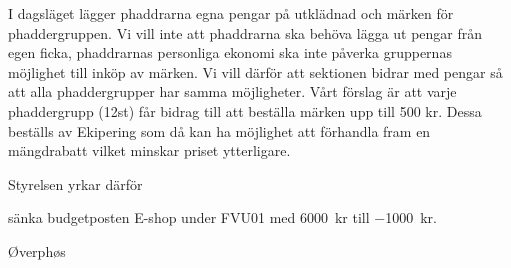 \documentclass[../_main/handlingar.tex]{subfiles}
\begin{document}

I dagsläget lägger phaddrarna egna pengar på utklädnad och märken för phaddergruppen. Vi vill inte att phaddrarna ska behöva lägga ut pengar från egen ficka, phaddrarnas personliga ekonomi ska inte påverka gruppernas möjlighet till inköp av märken. Vi vill därför att sektionen bidrar med pengar så att alla phaddergrupper har samma möjligheter. Vårt förslag är att varje phaddergrupp (12st) får bidrag till att beställa märken upp till 500 kr. Dessa beställs av Ekipering som då kan ha möjlighet att förhandla fram en mängdrabatt vilket minskar priset ytterligare.

Styrelsen yrkar därför 
\begin{attsatser}
     \att sänka budgetposten E-shop under FVU01 med \SI{6000}{kr} till \SI{-1000}{kr}.  
\end{attsatser}

\begin{signatures}{1}
    \ist
    \signature{\oph}{Øverphøs}
    
\end{signatures}
\end{document}
